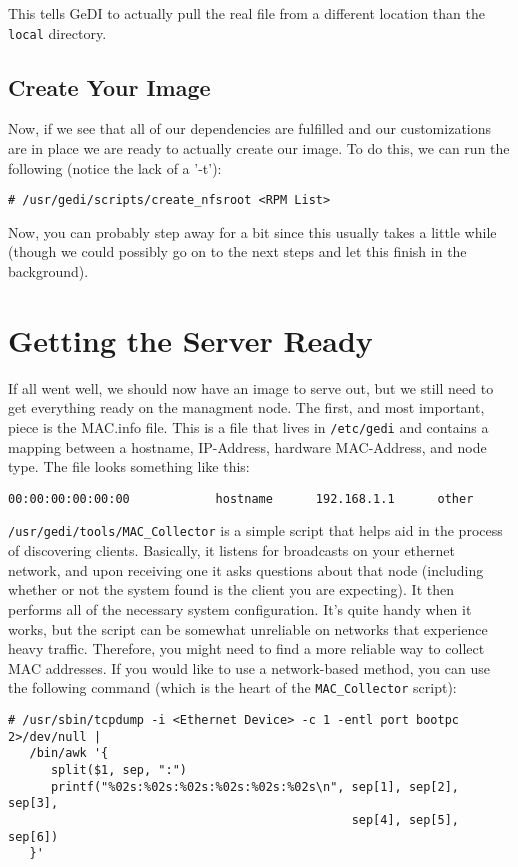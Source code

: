 \documentclass[10pt,a4paper,titlepage]{article}
\begin{document}
This tells GeDI to actually pull the real file from a different location than
the \verb!local! directory.

\subsection{Create Your Image}
Now, if we see that all of our dependencies are fulfilled and our
customizations are in place we are ready to actually create our image.  To do
this, we can run the following (notice the lack of a '-t'):
\begin{verbatim}
# /usr/gedi/scripts/create_nfsroot <RPM List>
\end{verbatim}
Now, you can probably step away for a bit since this usually takes a little
while (though we could possibly go on to the next steps and let this finish
in the background).

\section{Getting the Server Ready}
If all went well, we should now have an image to serve out, but we still need
to get everything ready on the managment node.  The first, and most important,
piece is the MAC.info file.  This is a file that lives in \verb!/etc/gedi!
and contains a mapping between a hostname, IP-Address, hardware MAC-Address,
and node type.  The file looks something like this:

\begin{verbatim}
00:00:00:00:00:00            hostname      192.168.1.1      other
\end{verbatim}

\verb!/usr/gedi/tools/MAC_Collector! is a simple script that helps aid in the
process of discovering clients.  Basically, it listens for broadcasts on your
ethernet network, and upon receiving one it asks questions about that node
(including whether or not the system found is the client you are expecting).
It then performs all of the necessary system configuration.  It's quite handy
when it works, but the script can be somewhat unreliable on networks that
experience heavy traffic.  Therefore, you might need to find a more reliable way
to collect MAC addresses.  If you would like to use a network-based method, you
can use the following command (which is the heart of the \verb!MAC_Collector!
script):

\begin{verbatim}
# /usr/sbin/tcpdump -i <Ethernet Device> -c 1 -entl port bootpc 2>/dev/null |
   /bin/awk '{
      split($1, sep, ":")
      printf("%02s:%02s:%02s:%02s:%02s:%02s\n", sep[1], sep[2], sep[3],
                                                sep[4], sep[5], sep[6])
   }'
\end{verbatim}
\end{document}
